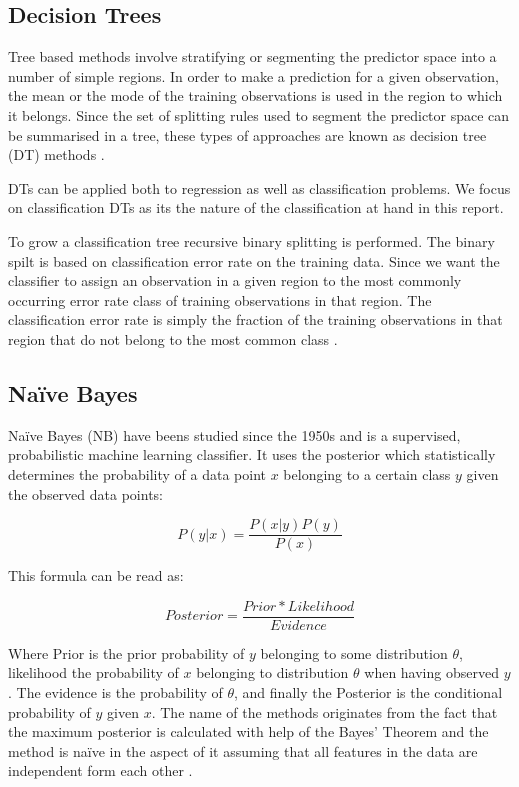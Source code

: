 \subsection{Decision Trees}

Tree based methods involve stratifying or segmenting the predictor space into a number of simple regions. In order to make a prediction for a given observation, the mean or the mode of the training observations is used in the region to which it belongs. Since the set of splitting rules used
to segment the predictor space can be summarised in a tree, these types of approaches are known as decision tree (DT) methods \parencite{James:2014}.

DTs can be applied both to regression as well as classification problems. We focus on classification DTs as its the nature of the classification at hand in this report.

To grow a classification tree recursive
binary splitting is performed. The binary spilt is based on classification error rate on the training data. Since we want the classifier to assign an observation in a given region to the most commonly occurring error rate class of training observations in that region. The classification error rate is simply the fraction of the training observations in that region that do not belong to the most common class \parencite{James:2014}.

\subsection{Naïve Bayes}

Naïve Bayes (NB) have beens studied since the 1950s and is a supervised, probabilistic machine learning classifier. It uses the posterior which statistically determines the probability of a data point $x$ belonging to a certain class $y$ given the observed data points:

\[
P(y|x) = \frac{P(x|y)P(y)}{P(x)}
\]

This formula can be read as:

\[
Posterior = \frac{Prior * Likelihood}{Evidence}
\]

Where Prior is the prior probability of $y$ belonging to some distribution $\theta$, likelihood the probability of $x$ belonging to distribution $\theta$ when having observed $y$. The evidence is the probability of $\theta$, and finally the Posterior is the conditional probability of $y$ given $x$. The name of the methods originates from the fact that the maximum posterior is calculated with help of the Bayes' Theorem and the method is naïve in the aspect of it assuming that all features in the data are independent form each other \parencite{george2012}.


